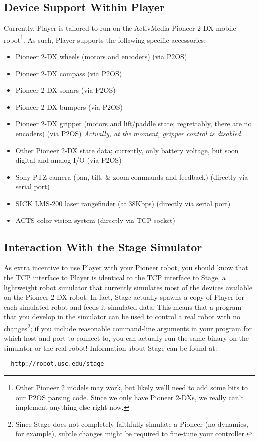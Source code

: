 \documentclass[11pt]{article}
\begin{document}
\subsection{Device Support Within Player}
Currently, Player is tailored to run on the ActivMedia Pioneer 2-DX mobile
robot\footnote{Other Pioneer 2 models may work, but likely we'll need to
add some bits to our P2OS parsing code.  Since we only have Pioneer 2-DXs,
we really can't implement anything else right now.}.
As such, Player supports the following specific accessories:
\begin{itemize}
\item Pioneer 2-DX wheels (motors and encoders) (via P2OS)
\item Pioneer 2-DX compass (via P2OS)
\item Pioneer 2-DX sonars (via P2OS)
\item Pioneer 2-DX bumpers (via P2OS)
\item Pioneer 2-DX gripper (motors and lift/paddle state; regrettably, there are no encoders) (via P2OS) {\sl Actually, at the moment, gripper control is disabled...}
\item Other Pioneer 2-DX state data; currently, only
battery voltage, but soon digital and analog I/O (via P2OS)
\item Sony PTZ camera (pan, tilt, \& zoom commands and feedback) 
(directly via serial port)
\item SICK LMS-200 laser rangefinder (at 38Kbps) (directly via serial port)
\item ACTS color vision system (directly via TCP socket)
\end{itemize}

\subsection{Interaction With the Stage Simulator}
\label{stage}
As extra incentive to use Player with your Pioneer robot, you should know
that the TCP interface to Player is identical to the TCP interface
to Stage, a lightweight robot simulator that currently simulates most
of the devices available on the Pioneer 2-DX robot.  In fact, Stage
actually spawns a copy of Player for each simulated robot and feeds it
simulated data.  This means that a program that you develop in the simulator
can be used to control a real robot with no changes\footnote{Since Stage
does not completely faithfully simulate a Pioneer (no dynamics, for example),
subtle changes might be required to fine-tune your controller.}; if you include
reasonable command-line arguments in your program for which host and port
to connect to, you can actually run the same binary on the simulator
or the real robot!  Information about Stage can be found at:
\begin{verbatim}
  http://robot.usc.edu/stage
\end{verbatim}
\end{document}
